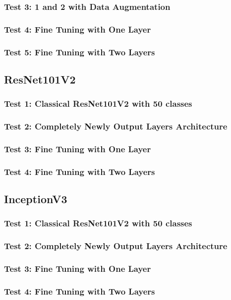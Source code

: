 \subsubsection{Test 3: 1 and 2 with Data Augmentation}

\subsubsection{Test 4: Fine Tuning with One Layer}

\subsubsection{Test 5: Fine Tuning with Two Layers}







\subsection{ResNet101V2}

\subsubsection{Test 1: Classical ResNet101V2 with 50 classes}

\subsubsection{Test 2: Completely Newly Output Layers Architecture}

\subsubsection{Test 3: Fine Tuning with One Layer}

\subsubsection{Test 4: Fine Tuning with Two Layers}







\subsection{InceptionV3}

\subsubsection{Test 1: Classical ResNet101V2 with 50 classes}

\subsubsection{Test 2: Completely Newly Output Layers Architecture}

\subsubsection{Test 3: Fine Tuning with One Layer}

\subsubsection{Test 4: Fine Tuning with Two Layers}
